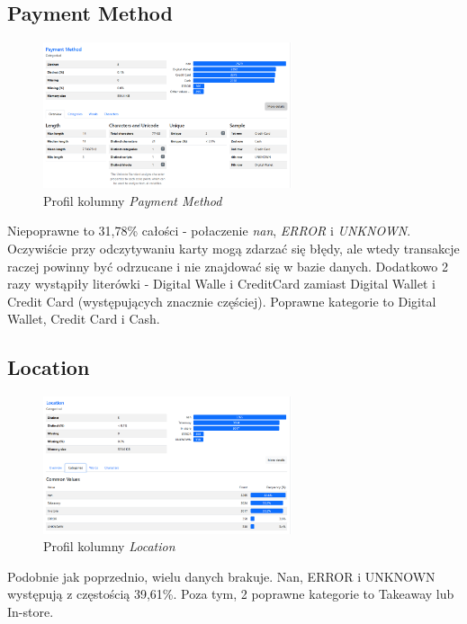\documentclass[a4paper,12pt]{article}
\begin{document}
\subsection{Payment Method}

\begin{figure}[H]
  \centering
  \includegraphics[width=0.65\textwidth]{images/py_6.png}
  \caption{Profil kolumny \textit{Payment Method}}
\end{figure}

Niepoprawne to 31,78\% całości - połaczenie \textit{nan}, \textit{ERROR} i \textit{UNKNOWN}. Oczywiście przy odczytywaniu karty mogą zdarzać się błędy, ale wtedy transakcje raczej powinny być odrzucane i nie znajdować się w bazie danych. Dodatkowo 2 razy wystąpiły literówki - Digital Walle i CreditCard zamiast Digital Wallet i Credit Card (występujących znacznie częściej). Poprawne kategorie to Digital Wallet, Credit Card	i Cash.

\subsection{Location}

\begin{figure}[H]
  \centering
  \includegraphics[width=0.65\textwidth]{images/py_7.png}
  \caption{Profil kolumny \textit{Location}}
\end{figure}

Podobnie jak poprzednio, wielu danych brakuje. Nan, ERROR i UNKNOWN występują z częstością 39,61\%. Poza tym, 2 poprawne kategorie to Takeaway lub In-store.
\end{document}
